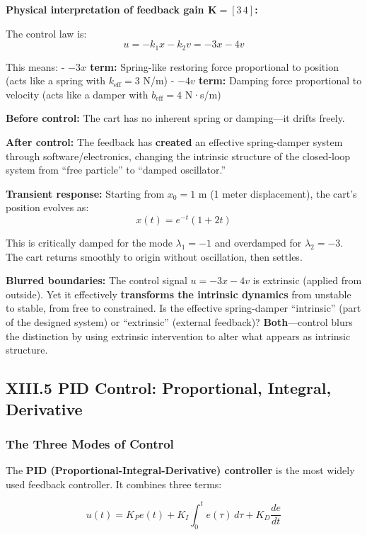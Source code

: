 \documentclass[
]{article}
\begin{document}
\textbf{Physical interpretation of feedback gain
\(\mathbf{K} = [3 \, 4]\):}

The control law is: \[u = -k_1 x - k_2 v = -3x - 4v\]

This means: - \textbf{\(-3x\) term:} Spring-like restoring force
proportional to position (acts like a spring with \(k_{\text{eff}} = 3\)
N/m) - \textbf{\(-4v\) term:} Damping force proportional to velocity
(acts like a damper with \(b_{\text{eff}} = 4\) N·s/m)

\textbf{Before control:} The cart has no inherent spring or damping---it
drifts freely.

\textbf{After control:} The feedback has \textbf{created} an effective
spring-damper system through software/electronics, changing the
intrinsic structure of the closed-loop system from ``free particle'' to
``damped oscillator.''

\textbf{Transient response:} Starting from \(x_0 = 1\) m (1 meter
displacement), the cart's position evolves as: \[x(t) = e^{-t}(1 + 2t)\]

This is critically damped for the mode \(\lambda_1 = -1\) and overdamped
for \(\lambda_2 = -3\). The cart returns smoothly to origin without
oscillation, then settles.

\textbf{Blurred boundaries:} The control signal \(u = -3x - 4v\) is
extrinsic (applied from outside). Yet it effectively \textbf{transforms
the intrinsic dynamics} from unstable to stable, from free to
constrained. Is the effective spring-damper ``intrinsic'' (part of the
designed system) or ``extrinsic'' (external feedback)?
\textbf{Both}---control blurs the distinction by using extrinsic
intervention to alter what appears as intrinsic structure.

\subsection{XIII.5 PID Control: Proportional, Integral,
Derivative}\label{xiii.5-pid-control-proportional-integral-derivative}

\subsubsection{The Three Modes of
Control}\label{the-three-modes-of-control}

The \textbf{PID (Proportional-Integral-Derivative) controller} is the
most widely used feedback controller. It combines three terms:

\[u(t) = K_P e(t) + K_I \int_0^t e(\tau)\,d\tau + K_D \frac{de}{dt}\]
\end{document}
